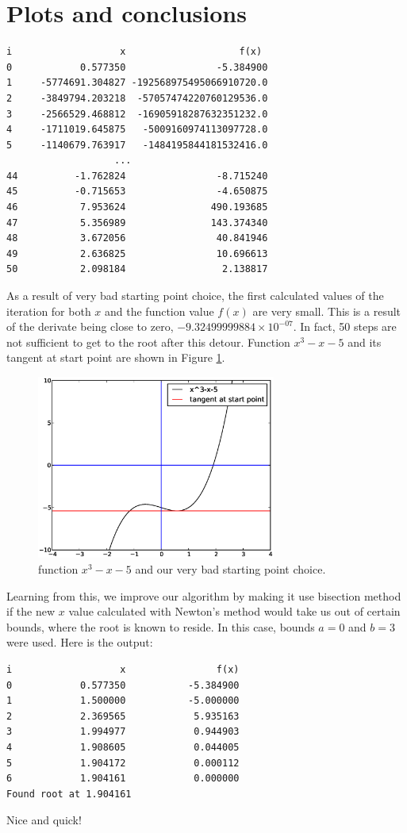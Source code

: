 \documentclass[a4paper,12pt]{scrartcl}
\begin{document}
\clearpage
\section{Plots and conclusions}
\begin{verbatim}
i                   x                    f(x)
0            0.577350                -5.384900
1     -5774691.304827 -192568975495066910720.0
2     -3849794.203218  -57057474220760129536.0
3     -2566529.468812  -16905918287632351232.0
4     -1711019.645875   -5009160974113097728.0
5     -1140679.763917   -1484195844181532416.0
                   ...
44          -1.762824                -8.715240
45          -0.715653                -4.650875
46           7.953624               490.193685
47           5.356989               143.374340
48           3.672056                40.841946
49           2.636825                10.696613
50           2.098184                 2.138817
\end{verbatim}
As a result of very bad starting point choice, the first calculated values of the iteration for both $x$ and the function value $f(x)$ are very small. This is a result of the derivate being close to zero, $-9.32499999884\times10^{-07}$. In fact, 50 steps are not sufficient to get to the root after this detour. Function $x^3-x-5$ and its tangent at start point are shown in Figure \ref{fig:newton}.
\begin{figure}[h!]
  \centering
    \includegraphics[width=0.7\textwidth]{newton}
  \caption{function $x^3-x-5$ and our very bad starting point choice.}
  \label{fig:newton}
\end{figure}
Learning from this, we improve our algorithm by making it use bisection method if the new $x$ value calculated with Newton's method would take us out of certain bounds, where the root is known to reside. In this case, bounds $a=0$ and $b=3$ were used. Here is the output:
\begin{verbatim}
i                   x                f(x)
0            0.577350           -5.384900
1            1.500000           -5.000000
2            2.369565            5.935163
3            1.994977            0.944903
4            1.908605            0.044005
5            1.904172            0.000112
6            1.904161            0.000000
Found root at 1.904161
\end{verbatim}
Nice and quick!
\clearpage
\end{document}
